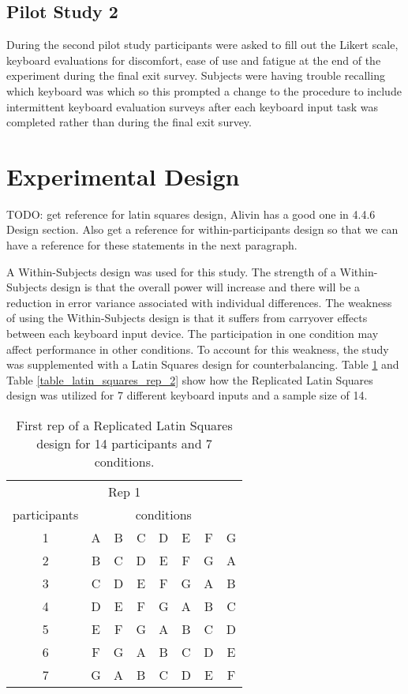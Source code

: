 \subsection{Pilot Study 2}

During the second pilot study participants were asked to fill out the Likert scale, keyboard evaluations for discomfort, ease of use and fatigue at the end of the experiment during the final exit survey. Subjects were having trouble recalling which keyboard was which so this prompted a change to the procedure to include intermittent keyboard evaluation surveys after each keyboard input task was completed rather than during the final exit survey.

\section{Experimental Design} \label{experimental_design}

TODO: get reference for latin squares design, Alivin has a good one in 4.4.6 Design section. Also get a reference for within-participants design so that we can have a reference for these statements in the next paragraph.

A Within-Subjects design was used for this study. The strength of a Within-Subjects design is that the overall power will increase and there will be a reduction in error variance associated with individual differences. The weakness of using the Within-Subjects design is that it suffers from carryover effects between each keyboard input device. The participation in one condition may affect performance in other conditions. To account for this weakness, the study was supplemented with a Latin Squares design for counterbalancing. Table \ref{table_latin_squares_rep_1} and Table \ref{table_latin_squares_rep_2} show how the Replicated Latin Squares design was utilized for 7 different keyboard inputs and a sample size of 14.

\begin{table}[h] %
\centering
\caption[Latin Squares Design Rep 1]{\centering First rep of a Replicated Latin Squares design for 14 participants and 7 conditions.}
\label{table_latin_squares_rep_1}
\begin{tabular}{c | c c c c c c c}
    \hline
    \multicolumn{8}{c}{Rep 1} \\
    participants & \multicolumn{7}{c}{conditions} \\
    \hline
    1 & A & B & C & D & E & F & G \\
    2 & B & C & D & E & F & G & A \\
    3 & C & D & E & F & G & A & B \\
    4 & D & E & F & G & A & B & C \\
    5 & E & F & G & A & B & C & D \\
    6 & F & G & A & B & C & D & E \\
    7 & G & A & B & C & D & E & F \\
    \hline
\end{tabular}
\end{table}

